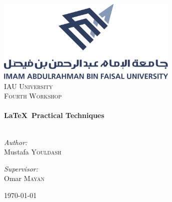 \begin{titlepage}
 
	\begin{center}
 
		\includegraphics[width=0.65\textwidth]{1200px-IAU}\\[1cm]
 
		\textsc{\LARGE IAU University}\\[1.5cm]
		\textsc{\Large Fourth Workshop}\\[0.5cm]
 
		\HRule \\[0.4cm]
		{ \huge \bfseries \LaTeX\ Practical Techniques}\\[0.4cm]
 
		\HRule \\[1.5cm]
 
		\begin{minipage}{0.4\textwidth}
		\begin{flushleft} \large
		\emph{Author:}\\
		Mustafa \textsc{Youldash}
		\end{flushleft}
		\end{minipage}
		\begin{minipage}{0.4\textwidth}
		\begin{flushright} \large
		\emph{Supervisor:} \\
		Omar \textsc{Mayan}
		\end{flushright}
		\end{minipage}
 
		\vfill
 
		\vfill
 
		{\large \today}
 
	\end{center}
 
\end{titlepage}
